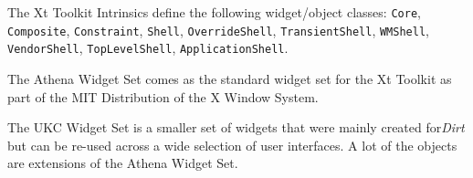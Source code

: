 The Xt Toolkit Intrinsics define the following widget/object
classes: {\tt Core}, {\tt Composite}, {\tt Constraint}, {\tt Shell},
{\tt OverrideShell}, {\tt TransientShell}, {\tt WMShell}, {\tt VendorShell},
{\tt TopLevelShell}, {\tt ApplicationShell}.

The Athena Widget Set comes as the standard widget set for the Xt 
Toolkit as part of the MIT Distribution of the X Window System.

The UKC Widget Set is a smaller set of widgets that were mainly created 
for{\em Dirt} but can be re-used across a wide selection of user 
interfaces. A lot of the objects are extensions of the Athena Widget
Set.

